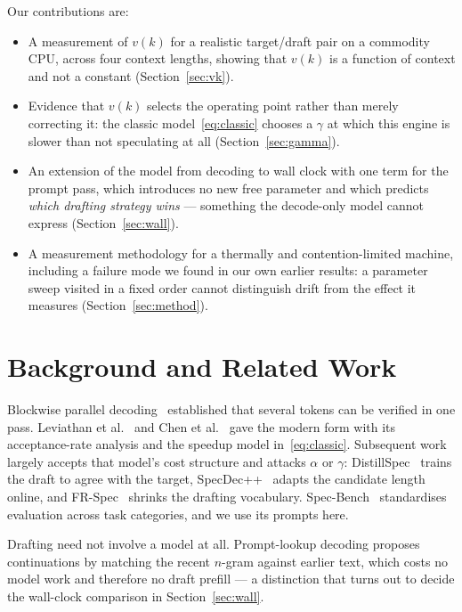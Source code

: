 \documentclass[conference]{IEEEtran}
\begin{document}
Our contributions are:
\begin{itemize}
  \item A measurement of $v(k)$ for a realistic target/draft pair on a commodity CPU, across four
        context lengths, showing that $v(k)$ is a function of context and not a constant
        (Section~\ref{sec:vk}).
  \item Evidence that $v(k)$ selects the operating point rather than merely correcting it: the
        classic model~\eqref{eq:classic} chooses a $\gamma$ at which this engine is slower than not
        speculating at all (Section~\ref{sec:gamma}).
  \item An extension of the model from decoding to wall clock with one term for the prompt pass,
        which introduces no new free parameter and which predicts \emph{which drafting strategy
        wins} --- something the decode-only model cannot express (Section~\ref{sec:wall}).
  \item A measurement methodology for a thermally and contention-limited machine, including a
        failure mode we found in our own earlier results: a parameter sweep visited in a fixed order
        cannot distinguish drift from the effect it measures (Section~\ref{sec:method}).
\end{itemize}

\section{Background and Related Work}

Blockwise parallel decoding~\cite{stern2018} established that several tokens can be verified in one
pass. Leviathan et al.~\cite{leviathan2023} and Chen et al.~\cite{chen2023} gave the modern form with
its acceptance-rate analysis and the speedup model in~\eqref{eq:classic}. Subsequent work largely
accepts that model's cost structure and attacks $\alpha$ or $\gamma$: DistillSpec~\cite{zhou2024}
trains the draft to agree with the target, SpecDec++~\cite{huang2024} adapts the candidate length
online, and FR-Spec~\cite{zhao2025} shrinks the drafting vocabulary. Spec-Bench~\cite{xia2024}
standardises evaluation across task categories, and we use its prompts here.

Drafting need not involve a model at all. Prompt-lookup decoding proposes continuations by matching
the recent $n$-gram against earlier text, which costs no model work and therefore no draft prefill ---
a distinction that turns out to decide the wall-clock comparison in Section~\ref{sec:wall}.
\end{document}
